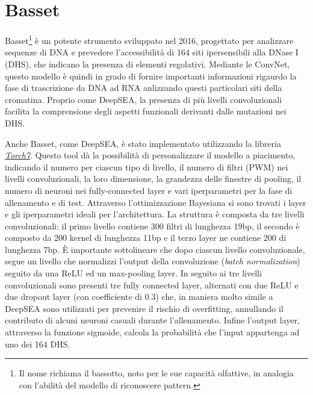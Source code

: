 





\section{Basset}\label{sec:Basset}
% 
Basset\footnote{Il nome richiama il bassotto, noto per le sue capacità olfattive, in analogia con l'abilità del modello di riconoscere pattern.} è un potente strumento sviluppato nel 2016, progettato per analizzare sequenze di DNA e prevedere l'accessibilità di 164 siti ipersensibili alla DNase I (\acs{DHS}), che indicano la presenza di elementi regolativi. Mediante le \acs{ConvNet}, questo modello è quindi in grado di fornire importanti informazioni rigaurdo la fase di trascrizione da \acs{DNA} ad \acs{RNA} anlizzando questi particolari siti della cromatina. Proprio come DeepSEA, la presenza di più livelli convoluzionali facilita la comprensione degli aspetti funzionali derivanti dalle mutazioni nei \acs{DHS}.

Anche Basset, come DeepSEA, è stato implementato utilizzando la libreria \href{https://github.com/torch/torch7}{\textsl{Torch7}}. Questo tool dà la possibilità di personalizzare il modello a piacimento, indicando il numero per ciascun tipo di livello, il numero di filtri (\acs{PWM}) nei livelli convoluzionali, la loro dimensione, la grandezza delle finestre di pooling, il numero di neuroni nei fully-connected layer e vari iperparametri per la fase di allenamento e di test. Attraverso l'ottimizzazione Bayesiana si sono trovati i layer e gli iperparametri ideali per l'architettura. La struttura è composta da tre livelli convoluzionali: il primo livello contiene 300 filtri di lunghezza 19bp, il secondo è composto da 200 kernel di lunghezza 11bp e il terzo layer ne contiene 200 di lunghezza 7bp. È importante sottolineare che dopo ciascun livello convoluzionale, segue un livello che normalizzi l'output della convoluzione (\textit{batch normalization}) seguito da una \acs{ReLU} ed un max-pooling layer. In seguito ai tre livelli convoluzionali sono presenti tre fully connected layer, alternati con due \acs{ReLU} e due dropout layer (con coefficiente di 0.3) che, in maniera molto simile a DeepSEA sono utilizzati per prevenire il rischio di overfitting, annullando il contributo di alcuni neuroni casuali durante l'allenamento. Infine l'output layer, attraverso la funzione sigmoide, calcola la probabilità che l'input appartenga ad uno dei 164 \acs{DHS}.

